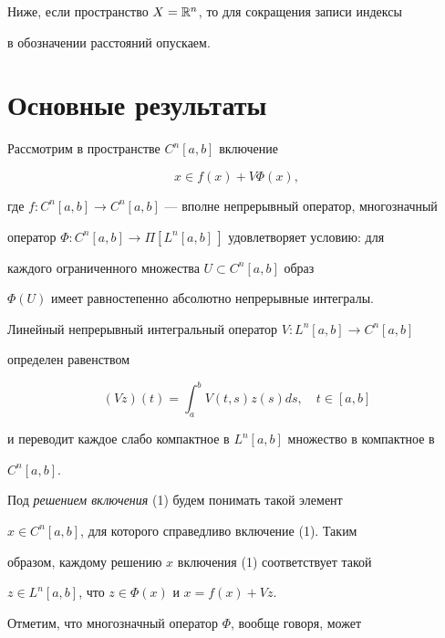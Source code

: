 Ниже, если пространство $X=\Bbb R^n$, то для сокращения записи индексы


в обозначении расстояний опускаем.





\section*{Основные результаты}





Рассмотрим в пространстве $C^n[a,b]$ включение


\begin{equation}


x\in f(x)+V\Phi(x),


\end{equation}


где $f:C^n[a,b]\to C^n[a,b]$ --- вполне непрерывный оператор, многозначный


оператор $\Phi:C^n[a,b]\to\Pi[L^n[a,b]\,]$ удовлетворяет условию: для


каждого ограниченного множества $U\subset C^n[a,b]$ образ


$\Phi(U)$ имеет равностепенно абсолютно непрерывные интегралы.


Линейный непрерывный интегральный оператор $V:L^n[a,b]\to C^n[a,b]$


определен равенством


\begin{equation}


(Vz)(t)=\int_a^b V(t,s)z(s)ds,\quad t\in[a,b]


\end{equation}


и переводит каждое слабо компактное в $L^n[a,b]$ множество в компактное в


$C^n[a,b]$.





Под {\it решением включения} (1) будем понимать такой элемент


$x\in C^n[a,b]$, для которого справедливо включение (1). Таким


образом, каждому решению $x$ включения (1) соответствует такой


$z\in L^n[a,b]$, что $z\in\Phi(x)$ и $x=f(x)+Vz$.





Отметим, что многозначный оператор $\Phi$, вообще говоря, может


